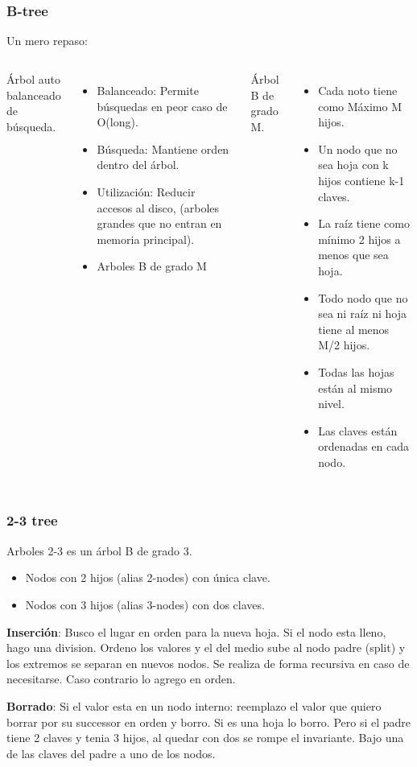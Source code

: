 \documentclass[10pt]{beamer}
\begin{document}
\section{}
\begin{frame}[noframenumbering]
\frametitle{B-tree}
Un mero repaso:

\begin{columns}
    Árbol auto balanceado de búsqueda.
    \begin{itemize}
       \item Balanceado: Permite búsquedas en peor caso de O(long).
       \item Búsqueda: Mantiene orden dentro del árbol.
       \item Utilización: Reducir accesos al disco, (arboles grandes que no entran en memoria principal).
       \item Arboles B de grado M
    \end{itemize}

    Árbol B de grado M.
        \begin{itemize}
          \item Cada noto tiene como Máximo M hijos.
          \item Un nodo que no sea hoja con k hijos contiene k-1 claves.
          \item La raíz tiene como mínimo 2 hijos a menos que sea hoja.
          \item Todo nodo que no sea ni raíz ni hoja tiene al menos M/2 hijos.
          \item Todas las hojas están al mismo nivel.
          \item Las claves están ordenadas en cada nodo.
        \end{itemize}
\end{columns}
\end{frame}
\begin{frame}[noframenumbering]
\frametitle{2-3 tree}

Arboles 2-3 es un árbol B de grado 3.
\begin{itemize}
  \item Nodos con 2 hijos (alias 2-nodes) con única clave.
  \item Nodos con 3 hijos (alias 3-nodes) con dos claves.
\end{itemize}

\textbf{Inserción}: Busco el lugar en orden para la nueva hoja. Si el nodo esta lleno, hago una division.
Ordeno los valores y el del medio sube al nodo padre (split) y los extremos se separan en nuevos nodos.
Se realiza de forma recursiva en caso de necesitarse.
Caso contrario lo agrego en orden.

\textbf{Borrado}: Si el valor esta en un nodo interno: reemplazo el valor que quiero borrar por su
successor en orden y borro.
Si es una hoja lo borro. Pero si el padre tiene 2 claves y tenia 3 hijos, al quedar con dos se rompe el invariante.
Bajo una de las claves del padre a uno de los nodos.
\end{frame}
\end{document}
